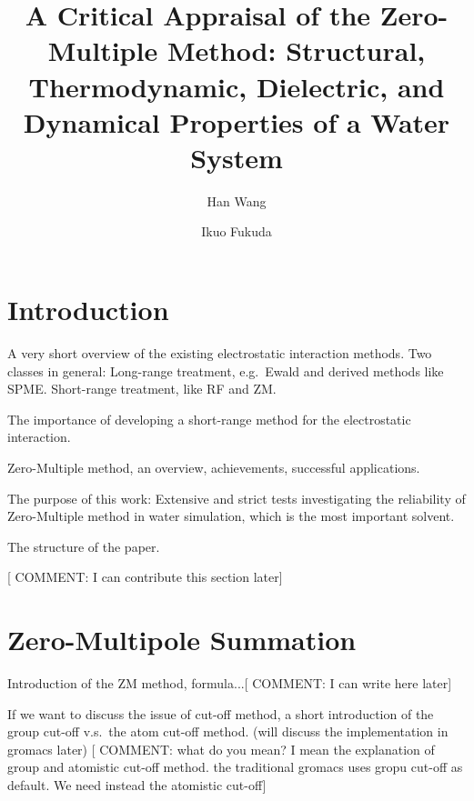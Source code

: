 \documentclass[a4paper,preprint,unsortedaddress,onecolumn,fleqn]{revtex4}
\newcommand{\recheck}[1]{{\color{red} #1}}
\begin{document}
\title{A Critical Appraisal of the Zero-Multiple Method: Structural,
Thermodynamic, Dielectric, and Dynamical Properties of a Water System}
\author{Han Wang}
\author{Ikuo Fukuda}

\begin{abstract}
\end{abstract}

\maketitle
{}


\section{Introduction}

A very short overview of the existing electrostatic interaction methods. Two
classes in general: Long-range treatment, e.g.~Ewald and derived methods
like SPME. Short-range treatment, like RF and ZM.

The importance of developing a short-range method for the electrostatic
interaction.

Zero-Multiple method, an overview, achievements, successful applications.

The purpose of this work: Extensive and strict tests investigating the
reliability of Zero-Multiple method in water simulation, which is the most
important solvent.

The structure of the paper.

[{\color{blue} COMMENT: I can contribute this section later}]

\section{Zero-Multipole Summation}

Introduction of the ZM method, formula...[ {\color{blue} COMMENT: I can
write here later}]

{\color{red} If we want to discuss the issue of cut-off method, a short
introduction of the group cut-off v.s.~the atom cut-off method. (will
discuss the implementation in gromacs later) }[ {\color{blue} COMMENT: what
do you mean? \recheck{I mean the explanation of group and atomistic cut-off method. the traditional gromacs uses gropu cut-off as default. We need instead the atomistic cut-off}}]
\end{document}
